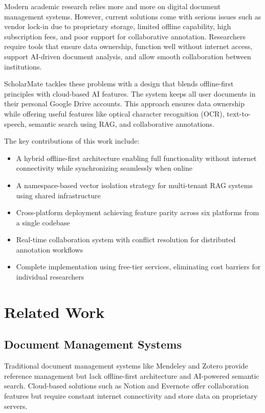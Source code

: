 \documentclass[conference]{IEEEtran}
\begin{document}
Modern academic research relies more and more on digital document management systems. However, current solutions come with serious issues such as vendor lock-in due to proprietary storage, limited offline capability, high subscription fees, and poor support for collaborative annotation. Researchers require tools that ensure data ownership, function well without internet access, support AI-driven document analysis, and allow smooth collaboration between institutions.

ScholarMate tackles these problems with a design that blends offline-first principles with cloud-based AI features. The system keeps all user documents in their personal Google Drive accounts. This approach ensures data ownership while offering useful features like optical character recognition (OCR), text-to-speech, semantic search using RAG, and collaborative annotations.

The key contributions of this work include:

\begin{itemize}
\item A hybrid offline-first architecture enabling full functionality without internet connectivity while synchronizing seamlessly when online
\item A namespace-based vector isolation strategy for multi-tenant RAG systems using shared infrastructure
\item Cross-platform deployment achieving feature parity across six platforms from a single codebase
\item Real-time collaboration system with conflict resolution for distributed annotation workflows
\item Complete implementation using free-tier services, eliminating cost barriers for individual researchers
\end{itemize}

\section{Related Work}

\subsection{Document Management Systems}

Traditional document management systems like Mendeley \cite{b1} and Zotero \cite{b2} provide reference management but lack offline-first architecture and AI-powered semantic search. Cloud-based solutions such as Notion and Evernote offer collaboration features but require constant internet connectivity and store data on proprietary servers.
\end{document}
